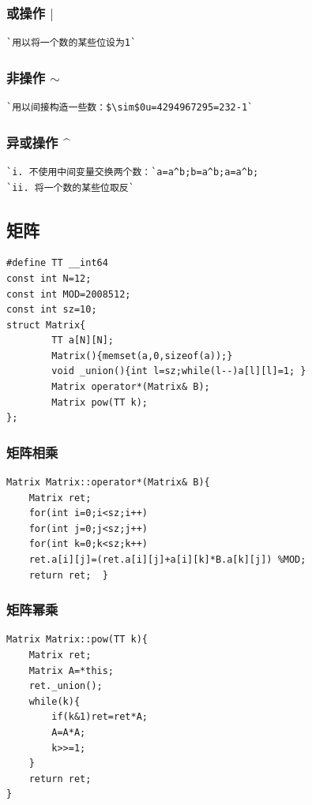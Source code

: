 \documentclass[a4paper]{article}
\begin{document}
\begin{CJK*}{UTF8}{gbsn}
\begin{multicols}{3}
\begin{flushleft}
\subsubsection{或操作 $|$}
\begin{lstlisting}
`用以将一个数的某些位设为1`
\end{lstlisting}

\subsubsection{非操作 $\sim$ }
\begin{lstlisting}
`用以间接构造一些数：$\sim$0u=4294967295=232-1`
\end{lstlisting}


\subsubsection{异或操作 \^{}}
\begin{lstlisting}
`i. 不使用中间变量交换两个数：`a=a^b;b=a^b;a=a^b;
`ii. 将一个数的某些位取反`
\end{lstlisting}



\subsection{矩阵}
\begin{lstlisting}
#define TT __int64
const int N=12;
const int MOD=2008512;
const int sz=10;
struct Matrix{
		TT a[N][N];	
		Matrix(){memset(a,0,sizeof(a));}
		void _union(){int l=sz;while(l--)a[l][l]=1; }
		Matrix operator*(Matrix& B);
		Matrix pow(TT k); 
}; 
\end{lstlisting}


\subsubsection{矩阵相乘}
\begin{lstlisting}
Matrix Matrix::operator*(Matrix& B){
	Matrix ret;
	for(int i=0;i<sz;i++)
	for(int j=0;j<sz;j++)
	for(int k=0;k<sz;k++)
	ret.a[i][j]=(ret.a[i][j]+a[i][k]*B.a[k][j]) %MOD;
	return ret;  } 
\end{lstlisting}

\subsubsection{矩阵幂乘}
\begin{lstlisting}
Matrix Matrix::pow(TT k){
	Matrix ret;
	Matrix A=*this;
	ret._union();
	while(k){
		if(k&1)ret=ret*A;
		A=A*A;
		k>>=1; 
	}
	return ret; 
}
\end{lstlisting}


\end{flushleft}
\end{multicols}
\end{CJK*}
\end{document}
